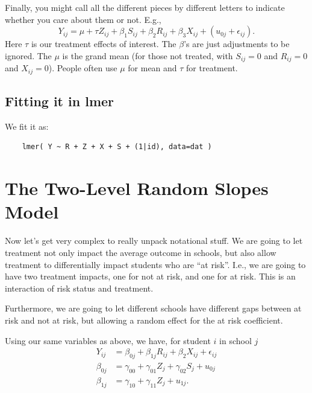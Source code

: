 \documentclass[
  letterpaper,
  DIV=11,
  numbers=noendperiod]{scrreprt}
\begin{document}
Finally, you might call all the different pieces by different letters to
indicate whether you care about them or not. E.g.,
\[Y_{ij} = \mu + \tau Z_{ij}  + \beta_1 S_{ij} + \beta_2 R_{ij} + \beta_3 X_{ij} + (u_{0j} +  \epsilon_{ij}) .\]
Here \(\tau\) is our treatment effects of interest. The \(\beta\)'s are
just adjustments to be ignored. The \(\mu\) is the grand mean (for those
not treated, with \(S_{ij} = 0\) and \(R_{ij} = 0\) and \(X_{ij} = 0\)).
People often use \(\mu\) for mean and \(\tau\) for treatment.

\subsection{Fitting it in lmer}\label{fitting-it-in-lmer}

We fit it as:

\begin{verbatim}
    lmer( Y ~ R + Z + X + S + (1|id), data=dat )
\end{verbatim}

\section{The Two-Level Random Slopes
Model}\label{the-two-level-random-slopes-model}

Now let's get very complex to really unpack notational stuff. We are
going to let treatment not only impact the average outcome in schools,
but also allow treatment to differentially impact students who are ``at
risk''. I.e., we are going to have two treatment impacts, one for not at
risk, and one for at risk. This is an interaction of risk status and
treatment.

Furthermore, we are going to let different schools have different gaps
between at risk and not at risk, but allowing a random effect for the at
risk coefficient.

Using our same variables as above, we have, for student \(i\) in school
\(j\) \[\begin{aligned}
Y_{ij} &= \beta_{0j} + \beta_{1j} R_{ij} + \beta_{2} X_{ij} + \epsilon_{ij} \\
\beta_{0j} &= \gamma_{00} + \gamma_{01} Z_{j} + \gamma_{02} S_{j} + u_{0j} \\
\beta_{1j} &= \gamma_{10} + \gamma_{11} Z_{j} + u_{1j} .
\end{aligned}\]
\end{document}
